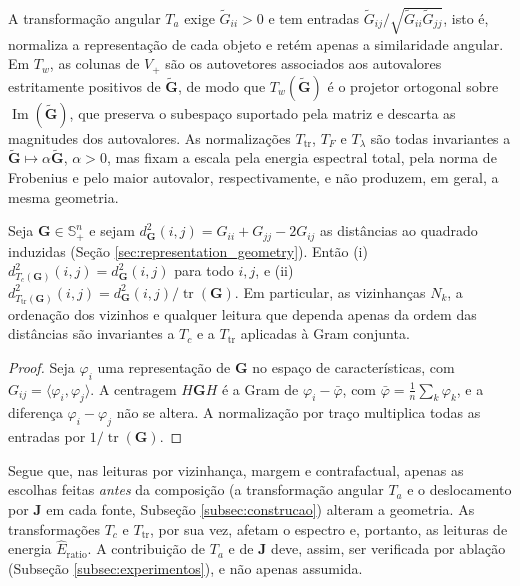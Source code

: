A transformação angular $T_a$ exige $\widetilde{G}_{ii}>0$ e tem entradas $\widetilde{G}_{ij}/\sqrt{\widetilde{G}_{ii}\widetilde{G}_{jj}}$, isto é, normaliza a representação de cada objeto e retém apenas a similaridade angular. Em $T_w$, as colunas de $V_+$ são os autovetores associados aos autovalores estritamente positivos de $\widetilde{\mathbf{G}}$, de modo que $T_w(\widetilde{\mathbf{G}})$ é o projetor ortogonal sobre $\operatorname{Im}(\widetilde{\mathbf{G}})$, que preserva o subespaço suportado pela matriz e descarta as magnitudes dos autovalores. As normalizações $T_{\mathrm{tr}}$, $T_F$ e $T_\lambda$ são todas invariantes a $\widetilde{\mathbf{G}} \mapsto \alpha\widetilde{\mathbf{G}}$, $\alpha>0$, mas fixam a escala pela energia espectral total, pela norma de Frobenius e pelo maior autovalor, respectivamente, e não produzem, em geral, a mesma geometria.

\begin{proposition}\label{prop:invariancia_distancias}
Seja $\mathbf{G}\in\mathbb{S}_+^n$ e sejam $d_{\mathbf{G}}^2(i,j)=G_{ii}+G_{jj}-2G_{ij}$ as distâncias ao quadrado induzidas (Seção \ref{sec:representation_geometry}). Então \textnormal{(i)} $d^2_{T_c(\mathbf{G})}(i,j)=d^2_{\mathbf{G}}(i,j)$ para todo $i,j$, e \textnormal{(ii)} $d^2_{T_{\mathrm{tr}}(\mathbf{G})}(i,j)=d^2_{\mathbf{G}}(i,j)/\operatorname{tr}(\mathbf{G})$. Em particular, as vizinhanças $N_k$, a ordenação dos vizinhos e qualquer leitura que dependa apenas da ordem das distâncias são invariantes a $T_c$ e a $T_{\mathrm{tr}}$ aplicadas à Gram conjunta.
\end{proposition}
\begin{proof}
Seja $\varphi_i$ uma representação de $\mathbf{G}$ no espaço de características, com $G_{ij}=\langle\varphi_i,\varphi_j\rangle$. A centragem $H\mathbf{G}H$ é a Gram de $\varphi_i-\bar\varphi$, com $\bar\varphi=\frac1n\sum_k\varphi_k$, e a diferença $\varphi_i-\varphi_j$ não se altera. A normalização por traço multiplica todas as entradas por $1/\operatorname{tr}(\mathbf{G})$.
\end{proof}
Segue que, nas leituras por vizinhança, margem e contrafactual, apenas as escolhas feitas \emph{antes} da composição (a transformação angular $T_a$ e o deslocamento por $\mathbf{J}$ em cada fonte, Subseção \ref{subsec:construcao}) alteram a geometria. As transformações $T_c$ e $T_{\mathrm{tr}}$, por sua vez, afetam o espectro e, portanto, as leituras de energia $\widehat{E}_{\mathrm{ratio}}$. A contribuição de $T_a$ e de $\mathbf{J}$ deve, assim, ser verificada por ablação (Subseção \ref{subsec:experimentos}), e não apenas assumida.

